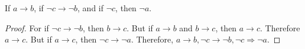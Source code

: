         \begin{problem}
            If $a\rightarrow{b}$, if $\neg{c}\rightarrow\neg{b}$, and if
            $\neg{c}$, then $\neg{a}$.
        \end{problem}
        \begin{proof}
            For if $\neg c \rightarrow \neg b$, then $b\rightarrow c$. But if
            $a\rightarrow b$ and $b\rightarrow c$, then $a\rightarrow c$.
            Therefore $a\rightarrow c$. But if $a\rightarrow c$, then
            $\neg c \rightarrow \neg a$. Therefore,
            $a\rightarrow b, \neg c \rightarrow \neg b, \neg c \Rightarrow \neg a$.
        \end{proof}